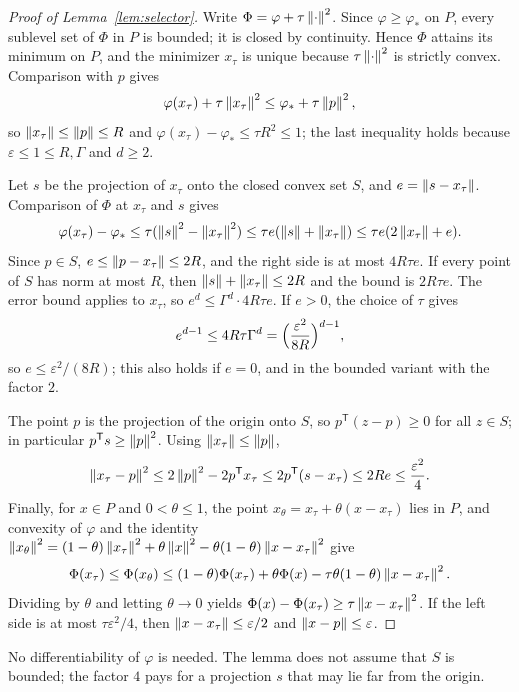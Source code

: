 \begin{proof}[Proof of Lemma~\ref{lem:selector}]
Write $\Phi=\varphi+\tau\left\lVert\cdot\right\rVert^2$. Since $\varphi\ge\varphi_*$ on $P$,
every sublevel set of $\Phi$ in $P$ is bounded; it is closed by continuity.
Hence $\Phi$ attains its minimum on $P$, and the minimizer $x_\tau$ is unique
because $\tau\left\lVert\cdot\right\rVert^2$ is strictly convex. Comparison with $p$ gives
\[
 \varphi(x_\tau)+\tau\left\lVert x_\tau\right\rVert^2\le\varphi_*+\tau\left\lVert p\right\rVert^2 ,
\]
so $\left\lVert x_\tau\right\rVert\le\left\lVert p\right\rVert\le R$ and
$\varphi(x_\tau)-\varphi_*\le\tau R^2\le1$; the last inequality holds
because $\varepsilon\le1\le R,\Gamma$ and $d\ge2$.

Let $s$ be the projection of $x_\tau$ onto the closed convex set $S$, and
$e=\left\lVert s-x_\tau\right\rVert$. Comparison of $\Phi$ at $x_\tau$ and $s$ gives
\[
 \varphi(x_\tau)-\varphi_*\le\tau(\left\lVert s\right\rVert^2-\left\lVert x_\tau\right\rVert^2)
 \le\tau e(\left\lVert s\right\rVert+\left\lVert x_\tau\right\rVert)\le\tau e(2\left\lVert x_\tau\right\rVert+e).
\]
Since $p\in S$, $e\le\left\lVert p-x_\tau\right\rVert\le2R$, and the right side is at most
$4R\tau e$. If every point of $S$ has norm at most $R$, then
$\left\lVert s\right\rVert+\left\lVert x_\tau\right\rVert\le2R$ and the bound is $2R\tau e$. The error bound
applies to $x_\tau$, so $e^d\le\Gamma^d\cdot4R\tau e$. If $e>0$, the choice
of $\tau$ gives
\[
 e^{d-1}\le4R\tau\Gamma^d=\Bigl(\frac{\varepsilon^2}{8R}\Bigr)^{d-1},
\]
so $e\le\varepsilon^2/(8R)$; this also holds if $e=0$, and in the bounded
variant with the factor $2$.

The point $p$ is the projection of the origin onto $S$, so
$p^{\mathsf T}(z-p)\ge0$ for all $z\in S$; in particular
$p^{\mathsf T}s\ge\left\lVert p\right\rVert^2$. Using $\left\lVert x_\tau\right\rVert\le\left\lVert p\right\rVert$,
\[
 \left\lVert x_\tau-p\right\rVert^2\le2\left\lVert p\right\rVert^2-2p^{\mathsf T}x_\tau
 \le2p^{\mathsf T}(s-x_\tau)\le2Re\le\frac{\varepsilon^2}4 .
\]
Finally, for $x\in P$ and $0<\theta\le1$, the point
$x_\theta=x_\tau+\theta(x-x_\tau)$ lies in $P$, and convexity of $\varphi$
and the identity
$\left\lVert x_\theta\right\rVert^2=(1-\theta)\left\lVert x_\tau\right\rVert^2+\theta\left\lVert x\right\rVert^2-
\theta(1-\theta)\left\lVert x-x_\tau\right\rVert^2$ give
\[
 \Phi(x_\tau)\le\Phi(x_\theta)\le(1-\theta)\Phi(x_\tau)+\theta\Phi(x)
 -\tau\theta(1-\theta)\left\lVert x-x_\tau\right\rVert^2 .
\]
Dividing by $\theta$ and letting $\theta\to0$ yields
$\Phi(x)-\Phi(x_\tau)\ge\tau\left\lVert x-x_\tau\right\rVert^2$. If the left side is at most
$\tau\varepsilon^2/4$, then $\left\lVert x-x_\tau\right\rVert\le\varepsilon/2$ and
$\left\lVert x-p\right\rVert\le\varepsilon$.
\end{proof}

No differentiability of $\varphi$ is needed. The lemma does not assume
that $S$ is bounded; the factor $4$ pays for a projection $s$ that may lie
far from the origin.


